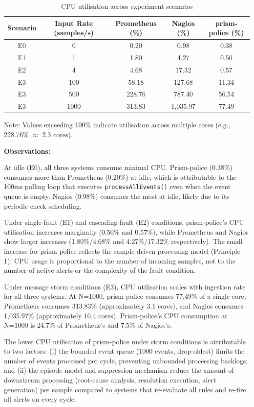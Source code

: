 \begin{table}[htbp]
\centering
\begin{tabular}{|c|c|c|c|c|}
\hline
Scenario & Input Rate (samples/s) & Prometheus (\%) & Nagios (\%) & prism-police (\%) \\
\hline
E0 & 0 & 0.20 & 0.98 & 0.38 \\
E1 & 1 & 1.80 & 4.27 & 0.50 \\
E2 & 4 & 4.68 & 17.32 & 0.57 \\
E3 & 100 & 58.18 & 127.68 & 11.34 \\
E3 & 500 & 228.76 & 787.40 & 56.54 \\
E3 & 1000 & 313.83 & 1,035.97 & 77.49 \\
\hline
\end{tabular}
\caption{CPU utilisation across experiment scenarios}
\label{tab:cpu-utilisation}
\end{table}

Note: Values exceeding 100\% indicate utilisation across multiple cores (e.g., 228.76\% $\approx$ 2.3 cores).

\textbf{Observations:}

At idle (E0), all three systems consume minimal CPU. Prism-police (0.38\%) consumes more than Prometheus (0.20\%) at idle, which is attributable to the 100ms polling loop that executes \texttt{processAllEvents()} even when the event queue is empty. Nagios (0.98\%) consumes the most at idle, likely due to its periodic check scheduling.

Under single-fault (E1) and cascading-fault (E2) conditions, prism-police's CPU utilisation increases marginally (0.50\% and 0.57\%), while Prometheus and Nagios show larger increases (1.80\%/4.68\% and 4.27\%/17.32\% respectively). The small increase for prism-police reflects the sample-driven processing model (Principle 1): CPU usage is proportional to the number of incoming samples, not to the number of active alerts or the complexity of the fault condition.

Under message storm conditions (E3), CPU utilisation scales with ingestion rate for all three systems. At N=1000, prism-police consumes 77.49\% of a single core, Prometheus consumes 313.83\% (approximately 3.1 cores), and Nagios consumes 1,035.97\% (approximately 10.4 cores). Prism-police's CPU consumption at N=1000 is 24.7\% of Prometheus's and 7.5\% of Nagios's.

The lower CPU utilisation of prism-police under storm conditions is attributable to two factors: (i) the bounded event queue (1000 events, drop-oldest) limits the number of events processed per cycle, preventing unbounded processing backlogs; and (ii) the episode model and suppression mechanism reduce the amount of downstream processing (root-cause analysis, resolution execution, alert generation) per sample compared to systems that re-evaluate all rules and re-fire all alerts on every cycle.

